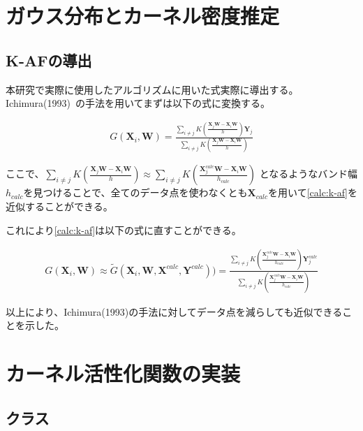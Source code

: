 \appendix
\chapter{ガウス分布とカーネル密度推定}


\section{K-AFの導出}
\label{appendix:calc}

本研究で実際に使用したアルゴリズムに用いた式実際に導出する。
Ichimura(1993)~\cite{ichimura}の手法を用いてまずは以下の式に変換する。


\begin{eqnarray}
G(\mathbf{X}_i, \mathbf{W})=\frac{\sum_{i\neq j} K\left(\frac{\mathbf{X}_j \mathbf{W} - \mathbf{X}_i \mathbf{W}}{h}\right)\mathbf{Y}_j}{\sum_{i\neq j} K\left(\frac{\mathbf{X}_j \mathbf{W} - \mathbf{X}_i \mathbf{W}}{h}\right)}
\label{calc:k-af}
\end{eqnarray}

ここで、$ \sum_{i\neq j} K\left(\frac{\mathbf{X}_j \mathbf{W} - \mathbf{X}_i \mathbf{W}}{h}\right) \approx	\sum_{i\neq j} K\left(\frac{\mathbf{X}^{calc}_j \mathbf{W} - \mathbf{X}_i \mathbf{W}}{h_{calc}}\right)$
となるようなバンド幅$ h_{calc} $を見つけることで、全てのデータ点を使わなくとも$ \mathbf{X}_{calc} $を用いて\ref{calc:k-af}を近似することができる。

これにより\ref{calc:k-af}は以下の式に直すことができる。

\begin{eqnarray}
G(\mathbf{X}_i, \mathbf{W}) \approx \tilde{G}(\mathbf{X}_i, \mathbf{W}, \mathbf{X}^{calc}, \mathbf{Y}^{calc})) = \frac{\sum_{i\neq j} K\left(\frac{\mathbf{X}^{calc}_j \mathbf{W} - \mathbf{X}_i \mathbf{W}}{h_{calc}}\right)\mathbf{Y}^{calc}_j}{\sum_{i\neq j} K\left(\frac{\mathbf{X}^{calc}_j \mathbf{W} - \mathbf{X}_i \mathbf{W}}{h_{calc}}\right)}
\label{calc:k-af-2}
\end{eqnarray}

以上により、Ichimura(1993)の手法に対してデータ点を減らしても近似できることを示した。


\chapter{カーネル活性化関数の実装}
\label{appendix:algorithm}


\section{クラス}



